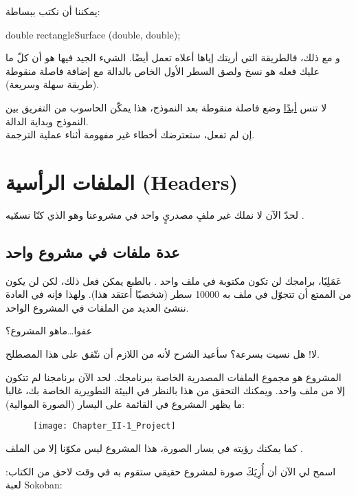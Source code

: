 يمكننا أن نكتب ببساطة:

\begin{Csource}
double rectangleSurface (double, double);
\end{Csource}

و مع ذلك، فالطريقة التي أريتك إياها أعلاه تعمل أيضًا. الشيء الجيد فيها هو أن كلّ ما عليك فعله هو نسخ ولصق السطر الأول الخاص بالدالة مع إضافة فاصلة منقوطة (طريقة سهلة وسريعة).

\begin{critical}
  لا تنس
\underline{أبدًا}
وضع فاصلة منقوطة بعد النموذج، هذا يمكّن الحاسوب من التفريق بين النموذج وبداية الدالة.\\
إن لم تفعل، ستعترضك أخطاء غير مفهومة أثناء عملية الترجمة.
\end{critical}

\section{الملفات الرأسية (\textenglish{Headers})}

لحدّ الآن لا نملك غير ملفٍ مصدريٍ واحد في مشروعنا وهو الذي كنّا نسمّيه
.

\subsection{عدة ملفات في مشروع واحد}

عَمَلِيًا، برامجك لن تكون مكتوبة في ملف واحد
.
بالطبع يمكن فعل ذلك، لكن لن يكون من الممتع أن تتجوّل في ملف به 10000 سطر (شخصيًا أعتقد هذا). ولهذا فإنه في العادة ننشئ العديد من الملفات في المشروع الواحد.
\begin{question}
  عفوا\dots ماهو المشروع؟
\end{question}
لا! هل نسيت بسرعة؟ سأعيد الشرح لأنه من اللازم أن نتّفق على هذا المصطلح.

المشروع هو مجموع الملفات المصدرية الخاصة ببرنامجك. لحد الآن برنامجنا لم تتكون إلا من ملف واحد. ويمكنك التحقق من هذا بالنظر في البيئة التطويرية الخاصة بك، غالبا ما يظهر المشروع في القائمة على اليسار (الصورة الموالية):

\begin{figure}[H]
	\centering
	\texttt{[image: Chapter\_II-1\_Project]}
\end{figure}

كما يمكنك رؤيته في يسار الصورة، هذا المشروع ليس مكوّنا إلا من الملف
.

اسمح لي الآن أن أُرِيَكَ صورة لمشروع حقيقي ستقوم به في وقت لاحق من الكتاب: لعبة 
\textenglish{Sokoban}:

